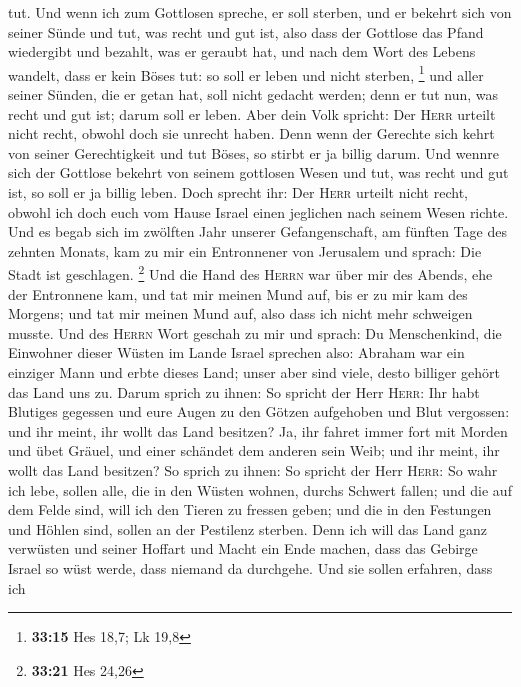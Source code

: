 tut.  Und wenn ich zum Gottlosen spreche, er soll
sterben, und er bekehrt sich von seiner Sünde und tut, was recht und gut
ist,  also dass der Gottlose das Pfand wiedergibt und
bezahlt, was er geraubt hat, und nach dem Wort des Lebens wandelt, dass
er kein Böses tut: so soll er leben und nicht sterben, \footnote{\textbf{33:15}
  Hes 18,7; Lk 19,8}  und aller seiner Sünden, die er
getan hat, soll nicht gedacht werden; denn er tut nun, was recht und gut
ist; darum soll er leben.  Aber dein Volk spricht: Der
\textsc{Herr} urteilt nicht recht, obwohl doch sie unrecht haben.
 Denn wenn der Gerechte sich kehrt von seiner
Gerechtigkeit und tut Böses, so stirbt er ja billig darum.
 Und wennre sich der Gottlose bekehrt von seinem
gottlosen Wesen und tut, was recht und gut ist, so soll er ja billig
leben.  Doch sprecht ihr: Der \textsc{Herr} urteilt nicht
recht, obwohl ich doch euch vom Hause Israel einen jeglichen nach seinem
Wesen richte.  Und es begab sich im zwölften Jahr unserer
Gefangenschaft, am fünften Tage des zehnten Monats, kam zu mir ein
Entronnener von Jerusalem und sprach: Die Stadt ist geschlagen.
\footnote{\textbf{33:21} Hes 24,26}  Und die Hand des
\textsc{Herrn} war über mir des Abends, ehe der Entronnene kam, und tat
mir meinen Mund auf, bis er zu mir kam des Morgens; und tat mir meinen
Mund auf, also dass ich nicht mehr schweigen musste.  Und
des \textsc{Herrn} Wort geschah zu mir und sprach:  Du
Menschenkind, die Einwohner dieser Wüsten im Lande Israel sprechen also:
Abraham war ein einziger Mann und erbte dieses Land; unser aber sind
viele, desto billiger gehört das Land uns zu.  Darum
sprich zu ihnen: So spricht der Herr \textsc{Herr}: Ihr habt Blutiges
gegessen und eure Augen zu den Götzen aufgehoben und Blut vergossen: und
ihr meint, ihr wollt das Land besitzen?  Ja, ihr fahret
immer fort mit Morden und übet Gräuel, und einer schändet dem anderen
sein Weib; und ihr meint, ihr wollt das Land besitzen? 
So sprich zu ihnen: So spricht der Herr \textsc{Herr}: So wahr ich lebe,
sollen alle, die in den Wüsten wohnen, durchs Schwert fallen; und die
auf dem Felde sind, will ich den Tieren zu fressen geben; und die in den
Festungen und Höhlen sind, sollen an der Pestilenz sterben.
 Denn ich will das Land ganz verwüsten und seiner Hoffart
und Macht ein Ende machen, dass das Gebirge Israel so wüst werde, dass
niemand da durchgehe.  Und sie sollen erfahren, dass ich
